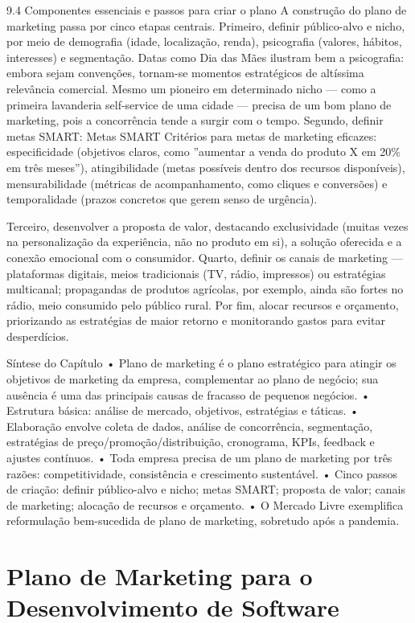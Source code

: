 9.4 Componentes essenciais e passos para criar o plano A construção do plano de marketing passa por cinco etapas centrais. Primeiro, definir público-alvo e nicho, por meio de demografia (idade, localização, renda), psicografia (valores, hábitos, interesses) e segmentação. Datas como Dia das Mães ilustram bem a psicografia: embora sejam convenções, tornam-se momentos estratégicos de altíssima relevância comercial. Mesmo um pioneiro em determinado nicho — como a primeira lavanderia self-service de uma cidade — precisa de um bom plano de marketing, pois a concorrência tende a surgir com o tempo. Segundo, definir metas SMART: Metas SMART Critérios para metas de marketing eficazes: especificidade (objetivos claros, como ”aumentar a venda do produto X em 20\% em três meses”), atingibilidade (metas possíveis dentro dos recursos disponíveis), mensurabilidade (métricas de acompanhamento, como cliques e conversões) e temporalidade (prazos concretos que gerem senso de urgência).

Terceiro, desenvolver a proposta de valor, destacando exclusividade (muitas vezes na personalização da experiência, não no produto em si), a solução oferecida e a conexão emocional com o consumidor. Quarto, definir os canais de marketing — plataformas digitais, meios tradicionais (TV, rádio, impressos) ou estratégias multicanal; propagandas de produtos agrícolas, por exemplo, ainda são fortes no rádio, meio consumido pelo público rural. Por fim, alocar recursos e orçamento, priorizando as estratégias de maior retorno e monitorando gastos para evitar desperdícios.

Síntese do Capítulo • Plano de marketing é o plano estratégico para atingir os objetivos de marketing da empresa, complementar ao plano de negócio; sua ausência é uma das principais causas de fracasso de pequenos negócios. • Estrutura básica: análise de mercado, objetivos, estratégias e táticas. • Elaboração envolve coleta de dados, análise de concorrência, segmentação, estratégias de preço/promoção/distribuição, cronograma, KPIs, feedback e ajustes contínuos. • Toda empresa precisa de um plano de marketing por três razões: competitividade, consistência e crescimento sustentável. • Cinco passos de criação: definir público-alvo e nicho; metas SMART; proposta de valor; canais de marketing; alocação de recursos e orçamento. • O Mercado Livre exemplifica reformulação bem-sucedida de plano de marketing, sobretudo após a pandemia.

\chapter{Plano de Marketing para o Desenvolvimento de Software}

